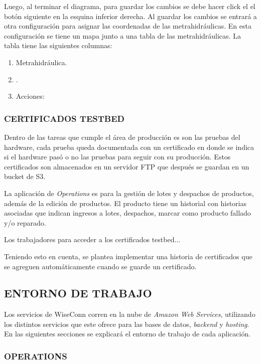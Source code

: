 Luego, al terminar el diagrama, para guardar los cambios se debe hacer click el el botón siguiente en la esquina inferior derecha. Al guardar los cambios se entrará a otra configuración para asignar las coordenadas de las metrahidráulicas. 
En esta configuración se tiene un mapa junto a una tabla de las metrahidráulicas. La tabla tiene las siguientes columnas:
\begin{enumerate}
    \item Metrahidráulica.
    \item .
    \item Acciones:
\end{enumerate}




\subsubsection{CERTIFICADOS TESTBED}

Dentro de las tareas que cumple el área de producción es son las pruebas del hardware, cada prueba queda documentada con
un certificado en donde se indica si el hardware pasó o no las pruebas para seguir con su producción. Estos certificados son
almacenados en un servidor FTP que después se guardan en un bucket de S3.

La aplicación de \textit{Operations} es para la gestión de lotes y despachos de productos, además de la edición de productos.
El producto tiene un historial con historias asociadas que indican ingresos a lotes, despachos, marcar como producto fallado y/o reparado.

Los trabajadores para acceder a los certificados testbed...

Teniendo esto en cuenta, se plantea implementar una historia de certificados que se agreguen automáticamente cuando se guarde un
certificado.

\subsection{ENTORNO DE TRABAJO}

Los servicios de WiseConn corren en la nube de \textit{Amazon Web Services}, utilizando los distintos servicios que este ofrece para las bases de datos, \textit{backend} y \textit{hosting}. En las siguientes secciones se explicará el entorno de trabajo de cada aplicación.

\subsubsection{OPERATIONS}

